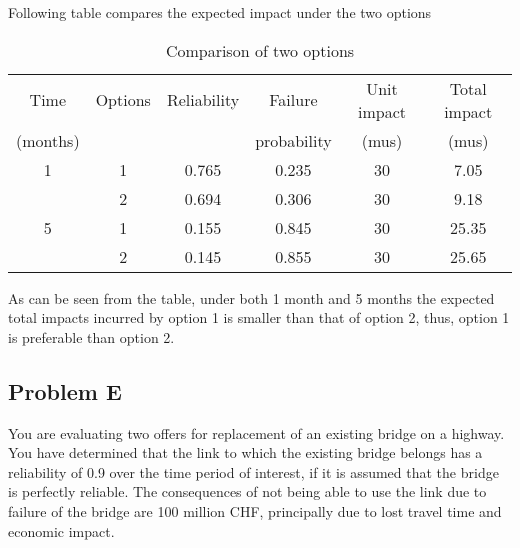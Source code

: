 Following table compares the expected impact under the two options
\begin{table}
\caption{Comparison of two options}
\label{tbl-reliability-a:4}
\begin{tabular}{|l|l|l|l|l|l|}
\hline
\multicolumn{1}{|c|}{Time} & \multicolumn{1}{c|}{Options} & \multicolumn{1}{c|}{Reliability} & \multicolumn{1}{c|}{Failure} & \multicolumn{1}{c|}{Unit impact} & \multicolumn{1}{c|}{Total impact} \\ 
\multicolumn{1}{|c|}{(months)} & \multicolumn{1}{c|}{} & \multicolumn{1}{c|}{} & \multicolumn{1}{c|}{probability} & \multicolumn{1}{c|}{(mus)} & \multicolumn{1}{c|}{(mus)} \\ 
\hline
\multicolumn{1}{|c|}{1} & \multicolumn{1}{c|}{1} & \multicolumn{1}{c|}{0.765} & \multicolumn{1}{c|}{0.235} & \multicolumn{1}{c|}{30} & \multicolumn{1}{c|}{7.05} \\ 
\cline{2-6}
\multicolumn{1}{|c|}{} & \multicolumn{1}{c|}{2} & \multicolumn{1}{c|}{0.694} & \multicolumn{1}{c|}{0.306} & \multicolumn{1}{c|}{30} & \multicolumn{1}{c|}{9.18} \\ 
\hline
\multicolumn{1}{|c|}{5} & \multicolumn{1}{c|}{1} & \multicolumn{1}{c|}{0.155} & \multicolumn{1}{c|}{0.845} & \multicolumn{1}{c|}{30} & \multicolumn{1}{c|}{25.35} \\ 
\cline{2-6}
\multicolumn{1}{|c|}{} & \multicolumn{1}{c|}{2} & \multicolumn{1}{c|}{0.145} & \multicolumn{1}{c|}{0.855} & \multicolumn{1}{c|}{30} & \multicolumn{1}{c|}{25.65} \\ 
\hline
\end{tabular}
\end{table}
As can be seen from the table, under both 1 month and 5 months the expected
total impacts incurred by option 1 is smaller than that of option 2, thus, option
1 is preferable than option 2.
\subsection{Problem E}

You are evaluating two offers for replacement of an existing bridge on a
highway. You have determined that the link to which the existing bridge belongs
has a reliability of 0.9 over the time period of interest, if it is assumed that
the bridge is perfectly reliable. The consequences of not being able to use the
link due to failure of the bridge are 100 million CHF, principally due to lost
travel time and economic impact.


